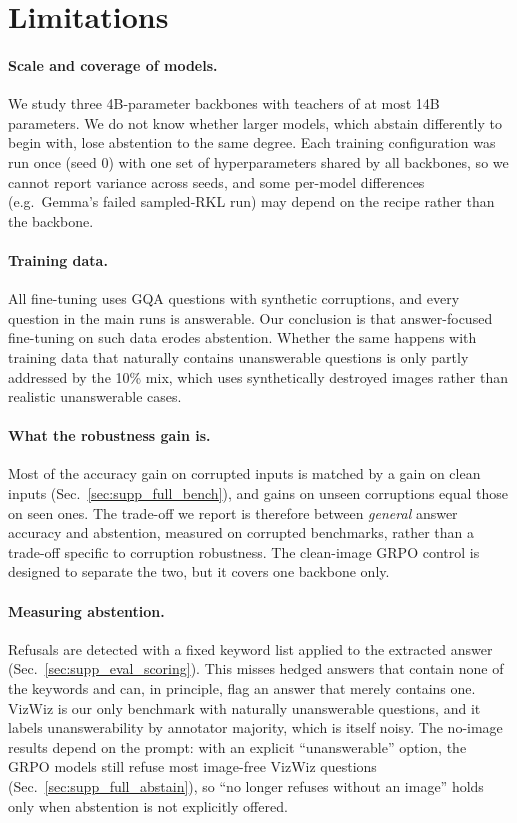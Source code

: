 \section{Limitations}
\label{sec:supp_limits}

\paragraph{Scale and coverage of models.}
We study three 4B-parameter backbones with teachers of at most 14B parameters. We do not know
whether larger models, which abstain differently to begin with, lose abstention to the same
degree. Each training configuration was run once (seed $0$) with one set of hyperparameters
shared by all backbones, so we cannot report variance across seeds, and some per-model
differences (e.g.\ Gemma's failed sampled-RKL run) may depend on the recipe rather than the
backbone.

\paragraph{Training data.}
All fine-tuning uses GQA questions with synthetic corruptions, and every question in the main
runs is answerable. Our conclusion is that answer-focused fine-tuning on such data erodes
abstention. Whether the same happens with training data that naturally contains
unanswerable questions is only partly addressed by the 10\% mix, which uses synthetically
destroyed images rather than realistic unanswerable cases.

\paragraph{What the robustness gain is.}
Most of the accuracy gain on corrupted inputs is matched by a gain on clean inputs
(Sec.~\ref{sec:supp_full_bench}), and gains on unseen corruptions equal those on seen ones.
The trade-off we report is therefore between \emph{general} answer accuracy and abstention,
measured on corrupted benchmarks, rather than a trade-off specific to corruption robustness.
The clean-image GRPO control is designed to separate the two, but it covers one backbone
only.

\paragraph{Measuring abstention.}
Refusals are detected with a fixed keyword list applied to the extracted answer
(Sec.~\ref{sec:supp_eval_scoring}). This misses hedged answers that contain none of the
keywords and can, in principle, flag an answer that merely contains one. VizWiz is our only
benchmark with naturally unanswerable questions, and it labels unanswerability by annotator
majority, which is itself noisy. The no-image results depend on the prompt: with an explicit
``unanswerable'' option, the GRPO models still refuse most image-free VizWiz questions
(Sec.~\ref{sec:supp_full_abstain}), so ``no longer refuses without an image'' holds only
when abstention is not explicitly offered.

